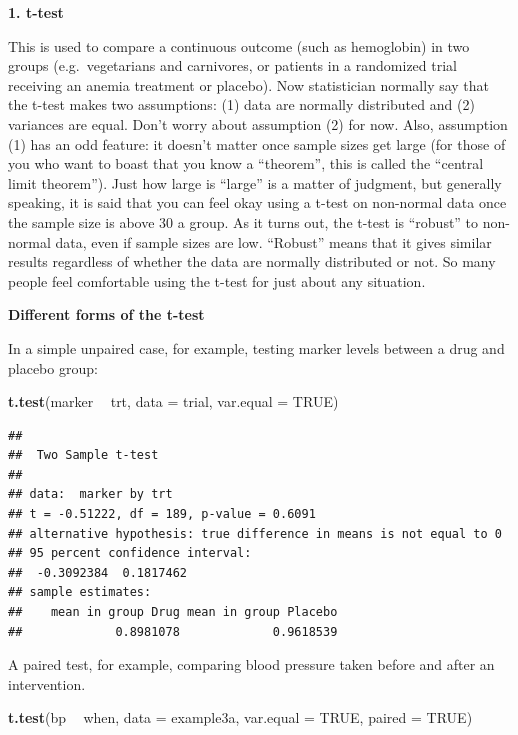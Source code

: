 \documentclass[]{book}
\newenvironment{Shaded}{\begin{snugshade}}{\end{snugshade}}
\newcommand{\DataTypeTok}[1]{\textcolor[rgb]{0.13,0.29,0.53}{#1}}
\newcommand{\KeywordTok}[1]{\textcolor[rgb]{0.13,0.29,0.53}{\textbf{#1}}}
\newcommand{\NormalTok}[1]{#1}
\newcommand{\OperatorTok}[1]{\textcolor[rgb]{0.81,0.36,0.00}{\textbf{#1}}}
\newcommand{\OtherTok}[1]{\textcolor[rgb]{0.56,0.35,0.01}{#1}}
\newcommand{\StringTok}[1]{\textcolor[rgb]{0.31,0.60,0.02}{#1}}
\begin{document}
\textbf{1. t-test}

This is used to compare a continuous outcome (such as hemoglobin) in two groups (e.g.~vegetarians and carnivores, or patients in a randomized trial receiving an anemia treatment or placebo). Now statistician normally say that the t-test makes two assumptions: (1) data are normally distributed and (2) variances are equal. Don't worry about assumption (2) for now. Also, assumption (1) has an odd feature: it doesn't matter once sample sizes get large (for those of you who want to boast that you know a ``theorem'', this is called the ``central limit theorem''). Just how large is ``large'' is a matter of judgment, but generally speaking, it is said that you can feel okay using a t-test on non-normal data once the sample size is above 30 a group. As it turns out, the t-test is ``robust'' to non-normal data, even if sample sizes are low. ``Robust'' means that it gives similar results regardless of whether the data are normally distributed or not. So many people feel comfortable using the t-test for just about any situation.

\textbf{Different forms of the t-test}

In a simple unpaired case, for example, testing marker levels between a drug and placebo group:

\begin{Shaded}
\begin{Highlighting}[]
\KeywordTok{t.test}\NormalTok{(marker }\OperatorTok{~}\StringTok{ }\NormalTok{trt, }\DataTypeTok{data =}\NormalTok{ trial, }\DataTypeTok{var.equal =} \OtherTok{TRUE}\NormalTok{)}
\end{Highlighting}
\end{Shaded}

\begin{verbatim}
## 
##  Two Sample t-test
## 
## data:  marker by trt
## t = -0.51222, df = 189, p-value = 0.6091
## alternative hypothesis: true difference in means is not equal to 0
## 95 percent confidence interval:
##  -0.3092384  0.1817462
## sample estimates:
##    mean in group Drug mean in group Placebo 
##             0.8981078             0.9618539
\end{verbatim}

A paired test, for example, comparing blood pressure taken before and after an intervention.

\begin{Shaded}
\begin{Highlighting}[]
\KeywordTok{t.test}\NormalTok{(bp }\OperatorTok{~}\StringTok{ }\NormalTok{when, }\DataTypeTok{data =}\NormalTok{ example3a, }\DataTypeTok{var.equal =} \OtherTok{TRUE}\NormalTok{, }\DataTypeTok{paired =} \OtherTok{TRUE}\NormalTok{)}
\end{Highlighting}
\end{Shaded}
\end{document}
